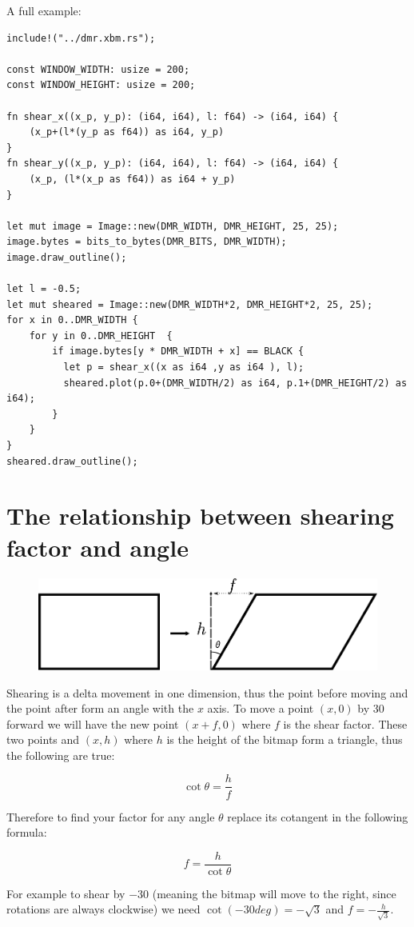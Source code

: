 \documentclass[12pt,openany,a4,usenames,dvipsnames]{book}
\newcommand\bitmap{{\pixelfont{}bitmap}}
\begin{document}
A full example:
\begin{verbatim}
include!("../dmr.xbm.rs");

const WINDOW_WIDTH: usize = 200;
const WINDOW_HEIGHT: usize = 200;

fn shear_x((x_p, y_p): (i64, i64), l: f64) -> (i64, i64) {
    (x_p+(l*(y_p as f64)) as i64, y_p)
}
fn shear_y((x_p, y_p): (i64, i64), l: f64) -> (i64, i64) {
    (x_p, (l*(x_p as f64)) as i64 + y_p)
}

let mut image = Image::new(DMR_WIDTH, DMR_HEIGHT, 25, 25);
image.bytes = bits_to_bytes(DMR_BITS, DMR_WIDTH);
image.draw_outline();

let l = -0.5;
let mut sheared = Image::new(DMR_WIDTH*2, DMR_HEIGHT*2, 25, 25);
for x in 0..DMR_WIDTH {
    for y in 0..DMR_HEIGHT  {
        if image.bytes[y * DMR_WIDTH + x] == BLACK {
          let p = shear_x((x as i64 ,y as i64 ), l);
          sheared.plot(p.0+(DMR_WIDTH/2) as i64, p.1+(DMR_HEIGHT/2) as i64); 
        }
    }
}
sheared.draw_outline();
\end{verbatim}
\section{The relationship between shearing factor and angle}
\begin{figure}[H]
\centering
\includegraphics[width=\textwidth,keepaspectratio]{figures/xshear.pdf}
\end{figure}
Shearing is a delta movement in one dimension, thus the point before moving and the point after form an angle with the $x$ axis. To move a point $(x, 0)$ by 30\textdegree{} forward we will have the new point $(x+f, 0)$ where $f$ is the shear factor. These two points and $(x, h)$ where $h$ is the height of the \bitmap{} form a triangle, thus the following are true:

$$\cot\theta{} = \frac{h}{f}$$

Therefore to find your factor for any angle $\theta{}$ replace its cotangent in the following formula:

$$f = \frac{h}{\cot\theta{}}$$

For example to shear by $-$30\textdegree{} (meaning the \bitmap{} will move to the right, since rotations are always clockwise) we need $\cot(-30deg) = -\sqrt{3}$ and $f=-\frac{h}{\sqrt{3}}$.
\end{document}

